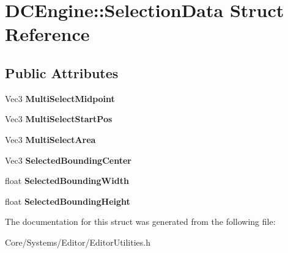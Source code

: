 \hypertarget{structDCEngine_1_1SelectionData}{\section{D\-C\-Engine\-:\-:Selection\-Data Struct Reference}
\label{structDCEngine_1_1SelectionData}
}
\subsection*{Public Attributes}
\begin{DoxyCompactItemize}
\item 
\hypertarget{structDCEngine_1_1SelectionData_a2970b0b5fa05c0ea512c6612ea5cbdd2}{Vec3 {\bfseries Multi\-Select\-Midpoint}}\label{structDCEngine_1_1SelectionData_a2970b0b5fa05c0ea512c6612ea5cbdd2}

\item 
\hypertarget{structDCEngine_1_1SelectionData_ab6ba19eb8b68e07c6d1b9683549784e7}{Vec3 {\bfseries Multi\-Select\-Start\-Pos}}\label{structDCEngine_1_1SelectionData_ab6ba19eb8b68e07c6d1b9683549784e7}

\item 
\hypertarget{structDCEngine_1_1SelectionData_ab0553bae53fc8b3e653e1919af8c4d7d}{Vec3 {\bfseries Multi\-Select\-Area}}\label{structDCEngine_1_1SelectionData_ab0553bae53fc8b3e653e1919af8c4d7d}

\item 
\hypertarget{structDCEngine_1_1SelectionData_a0ba69adf303bdc0b4169d06b938a8f63}{Vec3 {\bfseries Selected\-Bounding\-Center}}\label{structDCEngine_1_1SelectionData_a0ba69adf303bdc0b4169d06b938a8f63}

\item 
\hypertarget{structDCEngine_1_1SelectionData_a7d610654749e8bb91b408dab2406d458}{float {\bfseries Selected\-Bounding\-Width}}\label{structDCEngine_1_1SelectionData_a7d610654749e8bb91b408dab2406d458}

\item 
\hypertarget{structDCEngine_1_1SelectionData_a6cfc9ad6392b7ae8941265779e0a927d}{float {\bfseries Selected\-Bounding\-Height}}\label{structDCEngine_1_1SelectionData_a6cfc9ad6392b7ae8941265779e0a927d}

\end{DoxyCompactItemize}


The documentation for this struct was generated from the following file\-:\begin{DoxyCompactItemize}
\item 
Core/\-Systems/\-Editor/Editor\-Utilities.\-h\end{DoxyCompactItemize}
